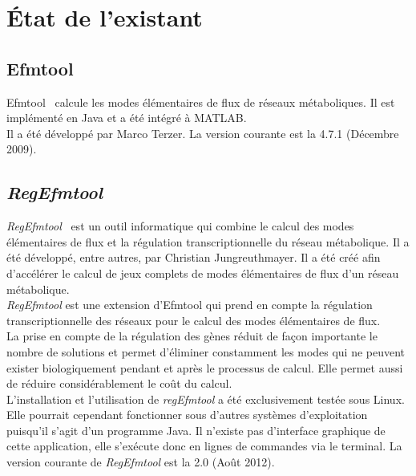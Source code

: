 \section{État de l'existant}

\subsection{Efmtool}
Efmtool~\cite{efmtool:url} calcule les modes élémentaires de flux de réseaux métaboliques. Il est implémenté en Java et a été intégré à MATLAB.\\
Il a été développé par Marco Terzer. La version courante est la 4.7.1 (Décembre 2009).

\subsection{\emph{RegEfmtool}}
\emph{RegEfmtool}~\cite{regefmtool2} est un outil informatique qui combine le calcul des modes élémentaires de flux et la régulation transcriptionnelle du réseau métabolique. Il a été développé, entre autres, par Christian Jungreuthmayer. Il a été créé afin d'accélérer le calcul de jeux complets de modes élémentaires de flux d'un réseau métabolique.\\
\emph{RegEfmtool} est une extension d'Efmtool qui prend en compte la régulation transcriptionnelle des réseaux pour le calcul des modes élémentaires de flux.\\
La prise en compte de la régulation des gènes réduit de façon importante le nombre de solutions et permet d'éliminer constamment les modes qui ne peuvent exister biologiquement pendant et après le processus de calcul. Elle permet aussi de réduire considérablement le coût du calcul.\\
L'installation et l'utilisation de \emph{regEfmtool} a été exclusivement testée sous Linux. Elle pourrait cependant fonctionner sous d'autres systèmes d'exploitation puisqu'il s'agit d'un programme Java. Il n'existe pas d'interface graphique de cette application, elle s'exécute donc en lignes de commandes via le terminal.
La version courante de \emph{RegEfmtool} est la 2.0 (Août 2012).

